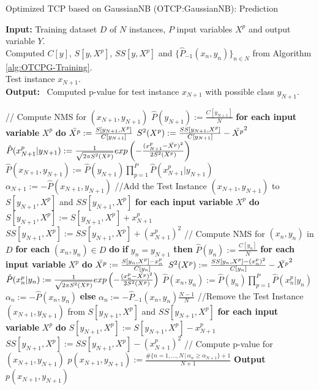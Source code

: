\documentclass[10pt]{reportMaster}
\begin{document}
\begin{algorithm}[H]
\caption{Optimized TCP based on GaussianNB (OTCP:GaussianNB): Prediction}\label{alg:OTCPG-Prediction}
\textbf{Input:} \; \; Training dataset $D$ of $N$ instances, $P$ input variables $X^p$ and output variable $Y$.\\
 \hspace*{\algorithmicindent} \quad \quad \; \; Computed $C[y]$, $S[y, X^p]$, $SS[y, X^p]$ and $\{\hat{P}_{-1}(x_n,y_n)\}_{n \in N}$ from Algorithm \ref{alg:OTCPG-Training}.\\
\hspace*{\algorithmicindent} \quad \quad \; \; Test instance $x_{N+1}$.\\
\textbf{Output:} \, Computed p-value for test instance $x_{N+1}$ with possible class $y_{N+1}$.
\begin{algorithmic}[1]
\State // Compute NMS for $(x_{N+1},y_{N+1})$
\State $\hat{P}(y_{N+1}) := \frac{C[y_{N+1}]}{N}$
\State \textbf{for each input variable} $X^p$ \textbf{do}
\State \qquad $\Bar{X^p}:=\frac{S[y_{N+1},X^p]}{C[y_{N+1}]}$
\State \qquad $S^2(X^p):=\frac{SS[y_{N+1},X^p]}{C[y_{N+1}]}-\Bar{X^p}^2$
\State \qquad $\hat{P}(x_{N+1}^p|y_{N+1}):=\frac{1}{\sqrt{2 \pi S^2(X^p)}}exp\left(-\frac{(x_{N+1}^p-\Bar{X^p})^2}{2S^2(X^p)}\right)$
\State $\hat{P}(x_{N+1},y_{N+1}):=\hat{P}(y_{N+1}) \prod_{p=1}^P \hat{P}(x_{N+1}^p|y_{N+1})$
\State $\alpha_{N+1} := -\hat{P}(x_{N+1},y_{N+1})$
\State //Add the Test Instance $(x_{N+1},y_{N+1})$ to $S[y_{N+1},X^p]$ and $SS[y_{N+1},X^p]$
\State \textbf{for each input variable} $X^p$ \textbf{do}
\State \qquad $S[y_{N+1},X^p] := S[y_{N+1},X^p] + x_{N+1}^p$
\State \qquad $SS[y_{N+1},X^p] := SS[y_{N+1},X^p] + (x_{N+1}^p)^2$
\State // Compute NMS for $(x_n,y_n)$ in $D$
\State \textbf{for each} $(x_n,y_n) \in D$ \textbf{do}
\State \qquad \textbf{if} $y_n=y_{N+1}$ \textbf{then}
\State \qquad \qquad $\hat{P}(y_n) := \frac{C[y_n]}{N}$
\State \qquad \qquad \textbf{for each input variable} $X^p$ \textbf{do}
\State \qquad \qquad \qquad $\Bar{X^p}:=\frac{S[y_n,X^p]-x_n^p}{C[y_n]}$
\State \qquad \qquad \qquad $S^2(X^p):=\frac{SS[y_n,X^p]-(x_n^p)^2}{C[y_n]}-\Bar{X^p}^2$
\State \qquad \qquad \qquad $\hat{P}(x_n^p|y_n):=\frac{1}{\sqrt{2 \pi S^2(X^p)}}exp\left(-\frac{(x_n^p-\Bar{X^p})^2}{2S^2(X^p)}\right)$
\State \qquad \qquad $\hat{P}(x_n,y_n):=\hat{P}(y_n) \prod_{p=1}^P \hat{P}(x_n^p|y_n)$
\State \qquad \qquad $\alpha_n := -\hat{P}(x_n,y_n)$
\State \qquad \textbf{else}
\State \qquad \qquad $\alpha_n := -\hat{P}_{-1}(x_n,y_n)\frac{N-1}{N}$
\State //Remove the Test Instance $(x_{N+1},y_{N+1})$ from $S[y_{N+1},X^p]$ and $SS[y_{N+1},X^p]$
\State \textbf{for each input variable} $X^p$ \textbf{do}
\State \qquad $S[y_{N+1},X^p] := S[y_{N+1},X^p] - x_{N+1}^p$
\State \qquad $SS[y_{N+1},X^p] := SS[y_{N+1},X^p] - (x_{N+1}^p)^2$
\State // Compute p-value for $(x_{N+1},y_{N+1})$
\State $p(x_{N+1},y_{N+1}):=\frac{\#\{n=1,...,N \,|\, \alpha_n \geq \alpha_{N+1}\}+1}{N+1}$
\State \textbf{Output} $p(x_{N+1},y_{N+1})$
\end{algorithmic}
\end{algorithm}
\end{document}
